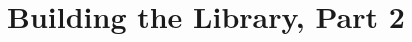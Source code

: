 %
%
%
%
%
%
%
%
%
%
%
%
%
%
%
%
%
%
%
%
%
%
%
%
%
%
%
%
%
%
%
%
%
%
%
%
%
%
%
%
%
%
%
%



\newpage
\section{Building the Library, Part 2}




